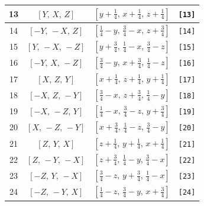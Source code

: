 \documentclass[fleqn,8pt]{jsarticle}
\begin{document}
\begin{longtable}{cccc}
13 & $\left[ Y,\, X,\, Z \right]$ & $\left[ y + \frac{1}{4},\, x + \frac{1}{4},\, z + \frac{1}{4} \right]$ & {\tt [13]} \\ \hline
14 & $\left[ - Y,\, - X,\, Z \right]$ & $\left[ \frac{1}{4} - y,\, \frac{3}{4} - x,\, z + \frac{3}{4} \right]$ & {\tt [14]} \\ \hline
15 & $\left[ Y,\, - X,\, - Z \right]$ & $\left[ y + \frac{3}{4},\, \frac{1}{4} - x,\, \frac{3}{4} - z \right]$ & {\tt [15]} \\ \hline
16 & $\left[ - Y,\, X,\, - Z \right]$ & $\left[ \frac{3}{4} - y,\, x + \frac{3}{4},\, \frac{1}{4} - z \right]$ & {\tt [16]} \\ \hline
17 & $\left[ X,\, Z,\, Y \right]$ & $\left[ x + \frac{1}{4},\, z + \frac{1}{4},\, y + \frac{1}{4} \right]$ & {\tt [17]} \\ \hline
18 & $\left[ - X,\, Z,\, - Y \right]$ & $\left[ \frac{3}{4} - x,\, z + \frac{3}{4},\, \frac{1}{4} - y \right]$ & {\tt [18]} \\ \hline
19 & $\left[ - X,\, - Z,\, Y \right]$ & $\left[ \frac{1}{4} - x,\, \frac{3}{4} - z,\, y + \frac{3}{4} \right]$ & {\tt [19]} \\ \hline
20 & $\left[ X,\, - Z,\, - Y \right]$ & $\left[ x + \frac{3}{4},\, \frac{1}{4} - z,\, \frac{3}{4} - y \right]$ & {\tt [20]} \\ \hline
21 & $\left[ Z,\, Y,\, X \right]$ & $\left[ z + \frac{1}{4},\, y + \frac{1}{4},\, x + \frac{1}{4} \right]$ & {\tt [21]} \\ \hline
22 & $\left[ Z,\, - Y,\, - X \right]$ & $\left[ z + \frac{3}{4},\, \frac{1}{4} - y,\, \frac{3}{4} - x \right]$ & {\tt [22]} \\ \hline
23 & $\left[ - Z,\, Y,\, - X \right]$ & $\left[ \frac{3}{4} - z,\, y + \frac{3}{4},\, \frac{1}{4} - x \right]$ & {\tt [23]} \\ \hline
24 & $\left[ - Z,\, - Y,\, X \right]$ & $\left[ \frac{1}{4} - z,\, \frac{3}{4} - y,\, x + \frac{3}{4} \right]$ & {\tt [24]} \\
\end{longtable}
\end{document}
